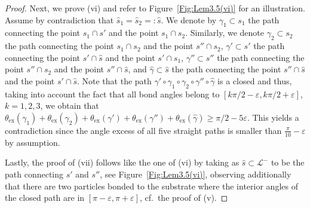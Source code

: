 \documentclass[reqno]{amsart}
\theoremstyle{plain}
\theoremstyle{definition}
\numberwithin{equation}{section}
\begin{document}
\begin{proof}
Next, we prove  {\rm (vi)} and refer to Figure~\ref{Fig:Lem3.5(vi)} for an illustration.  Assume by contradiction  that $\hat{s}_1 = \hat{s}_2 =:  \hat{s}$. We denote by $\gamma_1 \subset s_1$ the path connecting  the point $s_1 \cap s'$ and the point $s_1 \cap s_2$. Similarly, we denote $\gamma_2 \subset s_2$  the path connecting  the point $s_1 \cap s_2$ and the point $s'' \cap s_2$, $\gamma' \subset s'$ the path connecting  the point $s' \cap \hat{s}$ and the point $s' \cap s_1$, $\gamma'' \subset s''$ the path connecting  the point $s'' \cap s_2$ and the point $s'' \cap \hat{s}$, and $\hat{\gamma} \subset \hat{s}$ the path connecting  the point $s'' \cap \hat{s}$ and the point $s' \cap \hat{s}$. Note that the path $\gamma'\circ \gamma_1 \circ \gamma_2 \circ \gamma'' \circ \hat{\gamma}$ is a closed   and thus, taking into account the fact that all bond angles belong to $[k\pi/2-\varepsilon,k\pi/2+\varepsilon]$, $k=1,2,3$, we obtain that $\theta_{\mathrm{ex}}(\gamma_1) +\theta_{\mathrm{ex}}(\gamma_2) + \theta_{\mathrm{ex}}(\gamma') + \theta_{\mathrm{ex}}(\gamma'')+ \theta_{\mathrm{ex}}(\hat\gamma) \geq \pi/2-5\varepsilon$. This yields a contradiction since  the angle excess of all five straight paths is smaller than $\frac{\pi}{10}-\varepsilon$ by assumption.  

 Lastly, the proof of  {\rm (vii)} follows like the one of  {\rm (vi)}
 by taking as $\hat{s} \subset \mathcal{L}^-$  to be  the path
 connecting $s'$ and $s''$, see Figure~\ref{Fig:Lem3.5(vi)}, 
 observing additionally that there are two  particles  bonded to the
 substrate where the interior angles of the closed path are in
 $[\pi-\varepsilon,\pi+\varepsilon]$, cf.\ the proof of (v). 
 \end{proof}
\end{document}
